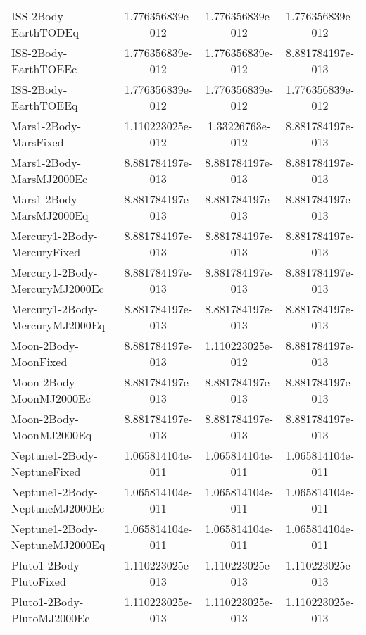 \begin{table}[htbp!]
\begin{tabular}{lccc}
         ISS-2Body-EarthTODEq & 1.776356839e-012 & 1.776356839e-012 & 1.776356839e-012 \\
         ISS-2Body-EarthTOEEc & 1.776356839e-012 & 1.776356839e-012 & 8.881784197e-013 \\
         ISS-2Body-EarthTOEEq & 1.776356839e-012 & 1.776356839e-012 & 1.776356839e-012 \\
         Mars1-2Body-MarsFixed & 1.110223025e-012 & 1.33226763e-012 & 8.881784197e-013 \\
         Mars1-2Body-MarsMJ2000Ec & 8.881784197e-013 & 8.881784197e-013 & 8.881784197e-013 \\
         Mars1-2Body-MarsMJ2000Eq & 8.881784197e-013 & 8.881784197e-013 & 8.881784197e-013 \\
         Mercury1-2Body-MercuryFixed & 8.881784197e-013 & 8.881784197e-013 & 8.881784197e-013 \\
         Mercury1-2Body-MercuryMJ2000Ec & 8.881784197e-013 & 8.881784197e-013 & 8.881784197e-013 \\
         Mercury1-2Body-MercuryMJ2000Eq & 8.881784197e-013 & 8.881784197e-013 & 8.881784197e-013 \\
         Moon-2Body-MoonFixed & 8.881784197e-013 & 1.110223025e-012 & 8.881784197e-013 \\
         Moon-2Body-MoonMJ2000Ec & 8.881784197e-013 & 8.881784197e-013 & 8.881784197e-013 \\
         Moon-2Body-MoonMJ2000Eq & 8.881784197e-013 & 8.881784197e-013 & 8.881784197e-013 \\
         Neptune1-2Body-NeptuneFixed & 1.065814104e-011 & 1.065814104e-011 & 1.065814104e-011 \\
         Neptune1-2Body-NeptuneMJ2000Ec & 1.065814104e-011 & 1.065814104e-011 & 1.065814104e-011 \\
         Neptune1-2Body-NeptuneMJ2000Eq & 1.065814104e-011 & 1.065814104e-011 & 1.065814104e-011 \\
         Pluto1-2Body-PlutoFixed & 1.110223025e-013 & 1.110223025e-013 & 1.110223025e-013 \\
         Pluto1-2Body-PlutoMJ2000Ec & 1.110223025e-013 & 1.110223025e-013 & 1.110223025e-013 \\

\end{tabular}
\end{table}
